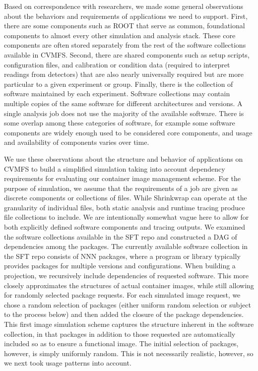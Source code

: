 \documentclass[sigconf]{acmart}
\begin{document}
Based on correspondence with researchers,
we made some general observations about the behaviors and requirements of applications we need to support.
First, there are some components such as ROOT that serve as common, foundational components to almost every other simulation and analysis stack.
These core components are often stored separately from the rest of the software collections available in CVMFS.
Second, there are shared components such as setup scripts, configuration files, and calibration or condition data (required to interpret readings from detectors) that are also nearly universally required but are more particular to a given experiment or group.
Finally, there is the collection of software maintained by each experiment.
Software collections may contain multiple copies of the same software for different architectures and versions.
A single analysis job does not use the majority of the available software.
There is some overlap among these categories of software,
for example some software components are widely enough used to be considered core components,
and usage and availability of components varies over time.

We use these observations about the structure and behavior of applications on CVMFS to build a simplified simulation taking into account dependency requirements for evaluating our container image management scheme.
For the purpose of simulation,
we assume that the requirements of a job are given as discrete components or collections of files.
While Shrinkwrap can operate at the granularity of individual files,
both static analysis and runtime tracing produce file collections to include.
We are intentionally somewhat vague here to allow for both explicitly defined software components and tracing outputs.
We examined the software collections available in the SFT repo and constructed a DAG of dependencies among the packages.
The currently available software collection in the SFT repo consists of NNN packages,
where a program or library typically provides packages for multiple versions and configurations.
When building a projection,
we recursively include dependencies of requested software.
This more closely approximates the structures of actual container images,
while still allowing for randomly selected package requests.
For each simulated image request,
we chose a random selection of packages (either uniform random selection or subject to the process below)
and then added the closure of the package dependencies.
This first image simulation scheme captures the structure inherent in the software collection,
in that packages in addition to those requested are automatically included so as to ensure a functional image.
The initial selection of packages,
however, is simply uniformly random.
This is not necessarily realistic, however,
so we next took usage patterns into account.
\end{document}

